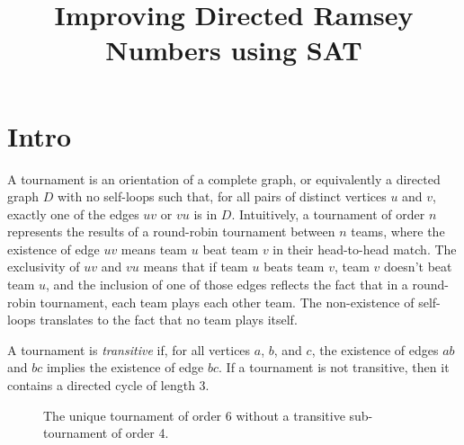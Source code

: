 \documentclass[conference]{IEEEtran}
\begin{document}
	
\title{Improving Directed Ramsey Numbers using SAT}

\author{

}


\newcommand{\mc}{}

\maketitle

\section*{Intro}


A tournament is an orientation of a complete graph, or equivalently a directed graph $D$ 
with no self-loops such that, for all pairs of distinct vertices $u$ and $v$, exactly one of
the edges $uv$ or $vu$ is in $D$. Intuitively, a tournament of order $n$ represents the
results of a round-robin tournament between $n$ teams, where the existence of edge
$uv$ means team $u$ beat team $v$ in their head-to-head match. The exclusivity of
$uv$ and $vu$ means that if team $u$ beats team $v$, team $v$ doesn't beat team
$u$, and the inclusion of one of those edges reflects the fact that in a round-robin
tournament, each team plays each other team. The non-existence of self-loops translates to the fact that no team plays itself.

A tournament is \textit{transitive} if, for all vertices $a$, $b$, and $c$, the existence of edges $ab$ and $bc$ implies the existence of edge $bc$.
If a tournament is not transitive, then it contains a directed cycle of length 3.


\begin{figure}[ht]
\centering
\caption{The unique tournament of order 6 without a transitive sub-tournament of order 4.}
\end{figure}
\end{document}
